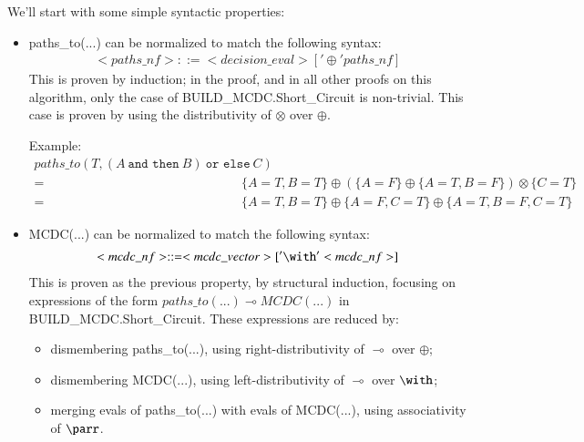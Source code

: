 \documentclass[a4paper,12pt,twoside]{article}
\newcommand{\andthen}{\texttt{and then}}
\newcommand{\orelse}{\texttt{or else}}
\begin{document}
We'll start with some simple syntactic properties:

\begin{itemize}
\item paths\_to(...) can be normalized to match the following syntax:
\begin{align*}
   <paths\_nf> ::= <decision\_eval> ['\oplus' paths\_nf]
\end{align*}
This is proven by induction; in the proof, and in all other proofs on this
algorithm, only the case of BUILD\_MCDC.Short\_Circuit is non-trivial. This
case is proven by using the distributivity of $\otimes$ over $\oplus$.

Example:
\begin{align*}
paths\_to(T, (A \ \andthen{} \ B) \ \orelse{} \ C) & \\
 = & \{A=T, B=T\} \oplus (\{A=F\} \oplus \{A=T, B=F\}) \otimes \{C=T\} \\
 = & \{A=T, B=T\} \oplus \{A=F, C=T\} \oplus \{A=T, B=F, C=T\}
\end{align*}

\item MCDC(...) can be normalized to match the following syntax:
\begin{align*}
   <mcdc\_nf> ::= <mcdc\_vector> ['\with' <mcdc\_nf>]
\end{align*}
This is proven as the previous property, by structural induction,
focusing on expressions of the form $paths\_to(...) \multimap MCDC(...)$
in BUILD\_MCDC.Short\_Circuit. These expressions are reduced by:
\begin{itemize}
\item dismembering paths\_to(...), using right-distributivity of $\multimap$
      over $\oplus$;
\item dismembering MCDC(...), using left-distributivity of $\multimap$
      over $\with$;
\item merging evals of paths\_to(...) with evals of MCDC(...),
      using associativity of $\parr$.
\end{itemize}


\end{itemize}
\end{document}

